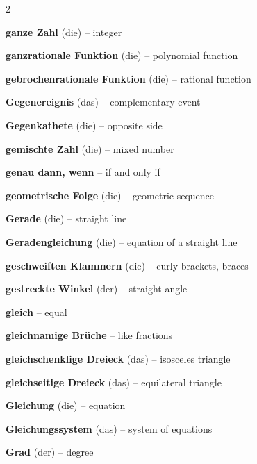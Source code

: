 \begin{multicols}{2}
\par\nopagebreak
\textbf{ganze Zahl} (die) -- integer\dotfill\hyperref[e:6]{\pageref*{e:6}}\par
\textbf{ganzrationale Funktion} (die) -- polynomial function\dotfill\hyperref[e:126]{\pageref*{e:126}}\par
\textbf{gebrochenrationale Funktion} (die) -- rational function\dotfill\hyperref[e:127]{\pageref*{e:127}}\par
\textbf{Gegenereignis} (das) -- complementary event\dotfill\hyperref[e:329]{\pageref*{e:329}}\par
\textbf{Gegenkathete} (die) -- opposite side\dotfill\hyperref[e:189]{\pageref*{e:189}}\par
\textbf{gemischte Zahl} (die) -- mixed number\dotfill\hyperref[e:33]{\pageref*{e:33}}\par
\textbf{genau dann, wenn} -- if and only if\dotfill\hyperref[e:351]{\pageref*{e:351}}\par
\textbf{geometrische Folge} (die) -- geometric sequence\dotfill\hyperref[e:260]{\pageref*{e:260}}\par
\textbf{Gerade} (die) -- straight line\dotfill\hyperref[e:147]{\pageref*{e:147}}\par
\textbf{Geradengleichung} (die) -- equation of a straight line\dotfill\hyperref[e:309]{\pageref*{e:309}}\par
\textbf{geschweiften Klammern} (die) -- curly brackets, braces\dotfill\hyperref[e:90]{\pageref*{e:90}}\par
\textbf{gestreckte Winkel} (der) -- straight angle\dotfill\hyperref[e:160]{\pageref*{e:160}}\par
\textbf{gleich} -- equal\dotfill\hyperref[e:60]{\pageref*{e:60}}\par
\textbf{gleichnamige Brüche} -- like fractions\dotfill\hyperref[e:34]{\pageref*{e:34}}\par
\textbf{gleichschenklige Dreieck} (das) -- isosceles triangle\dotfill\hyperref[e:182]{\pageref*{e:182}}\par
\textbf{gleichseitige Dreieck} (das) -- equilateral triangle\dotfill\hyperref[e:185]{\pageref*{e:185}}\par
\textbf{Gleichung} (die) -- equation\dotfill\hyperref[e:76]{\pageref*{e:76}}\par
\textbf{Gleichungssystem} (das) -- system of equations\dotfill\hyperref[e:80]{\pageref*{e:80}}\par
\textbf{Grad} (der) -- degree\dotfill\hyperref[e:75]{\pageref*{e:75}}\par

\end{multicols}
